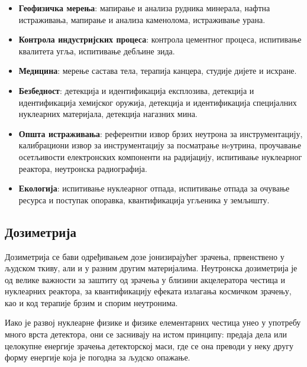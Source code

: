 \documentclass[11pt,a4paper,serbian,oneside]{book}
\begin{document}
\begin{itemize}
  
  \item \textbf{Геофизичка мерења}: мапирање и анализа рудника минерала, нафтна истраживања, мапирање и анализа каменолома, истраживање урана.

  \item \textbf{Контрола индустријских процеса}: контрола цементног процеса, испитивање квалитета угља, испитивање дебљине зида.

  \item \textbf{Медицина}: мерење састава тела, терапија канцера, студије дијете и исхране.

  \item \textbf{Безбедност}: детекција и идентификација експлозива, детекција и идентификација хемијског оружија, детекција и идентификација специјалних нуклеарних материјала, детекција нагазних мина.

  \item \textbf{Општа истраживања}: референтни извор брзих неутрона за инструментацију, калибрациони извор за инструментацију за посматрање нeутрина, проучавање осетљивости електронских компоненти на радијацију, испитивање нуклеарног реактора, неутронска радиографија.

  \item \textbf{Екологија}: испитивање нуклеарног отпада, испитивање отпада за очување ресурса и поступак опоравка, квантификација угљеника у земљишту.

\end{itemize}

\subsection{Дозиметрија}

Дозиметрија \cite{bmilenkovic} се бави одређивањем дозе јонизирајућег зрачења, првенствено у људском ткиву, али и у разним другим материјалима. Неутронска дозиметрија је од велике важности за заштиту од зрачења у близини акцелератора честица и нуклеарних реактора, за квантификацију ефеката излагања космичком зрачењу, као и код терапије брзим и спорим неутронима.

Иако је развој нуклеарне физике и физике елементарних честица унео у употребу много врста детектора, они се заснивају на истом принципу: предаја дела или целокупне енергије зрачења детекторској маси, где се она преводи у неку другу форму енергије која је погодна за људско опажање.
\end{document}
